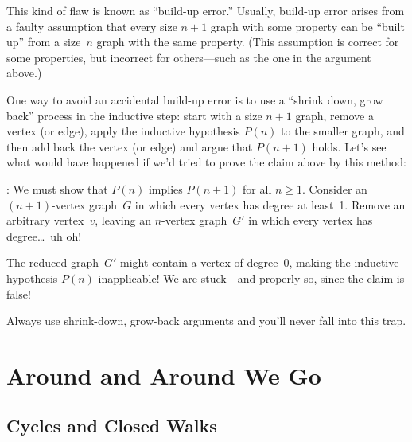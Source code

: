 This kind of flaw is known as ``build-up error.''  Usually, build-up
error arises from a faulty assumption that every size $n + 1$ graph
with some property can be ``built up'' from a size~$n$ graph with the
same property.  (This assumption is correct for some properties, but
incorrect for others---such as the one in the argument above.)

One way to avoid an accidental build-up error is to use a ``shrink
down, grow back'' process in the inductive step: \ie start with a size
$n+1$ graph, remove a vertex (or edge), apply the inductive hypothesis
$P(n)$ to the smaller graph, and then add back the vertex (or edge)
and argue that $P(n + 1)$ holds.  Let's see what would have happened
if we'd tried to prove the claim above by this method:

: We must show that $P(n)$
implies $P(n + 1)$ for all $n \ge 1$.  Consider an $(n + 1)$-vertex
graph~$G$ in which every vertex has degree at least~1.  Remove an
arbitrary vertex~$v$, leaving an $n$-vertex graph~$G'$ in which every
vertex has degree\dots\ uh oh!

The reduced graph~$G'$ might contain a vertex of degree~0, making the
inductive hypothesis $P(n)$ inapplicable!  We are stuck---and
properly so, since the claim is false!

Always use shrink-down, grow-back arguments and you'll never fall into
this trap.



\begin{problems}
\classproblems
{}
\homeworkproblems
{}


\homeworkproblems
{}
\end{problems}

\section{Around and Around We Go}

\subsection{Cycles and Closed Walks}

